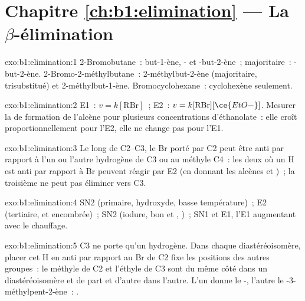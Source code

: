 \section*{Chapitre \ref{ch:b1:elimination} --- La \texorpdfstring{$\beta$}{Beta}-élimination}

\begin{solution}{exo:b1:elimination:1}
2-Bromobutane~: but-1-ène, - et -but-2-ène~; majoritaire~:
-but-2-ène. 2-Bromo-2-méthylbutane~: 2-méthylbut-2-ène
(majoritaire, trisubstitué) et 2-méthylbut-1-ène. Bromocyclohexane~:
cyclohexène seulement.
\end{solution}

\begin{solution}{exo:b1:elimination:2}
E1~: $v = k[\mathrm{RBr}]$~; E2~: $v = k[\mathrm{RBr}][\ce{EtO-}]$.
Mesurer la  de formation de l'alcène pour plusieurs
concentrations d'éthanolate~: elle croît proportionnellement pour l'E2,
elle ne change pas pour l'E1.
\end{solution}

\begin{solution}{exo:b1:elimination:3}
Le long de C2--C3, le Br porté par C2 peut être anti par rapport à l'un
ou l'autre hydrogène de C3 ou au méthyle C4~: les deux  où
un H est anti par rapport à Br peuvent réagir par E2 (en donnant les
alcènes  et )~; la troisième ne peut pas éliminer vers
C3.
\end{solution}

\begin{solution}{exo:b1:elimination:4}
SN2 (primaire, hydroxyde, basse température)~; E2 (tertiaire, 
et encombrée)~; SN2 (iodure, bon  et , )~; SN1 et E1, l'E1 augmentant avec le chauffage.
\end{solution}

\begin{solution}{exo:b1:elimination:5}
C3 ne porte qu'un hydrogène. Dans chaque diastéréoisomère, placer cet H
en anti par rapport au Br de C2 fixe les positions des autres groupes~:
le méthyle de C2 et l'éthyle de C3 sont du même côté dans un
diastéréoisomère et de part et d'autre dans l'autre. L'un donne le
-, l'autre le -3-méthylpent-2-ène~: .
\end{solution}

